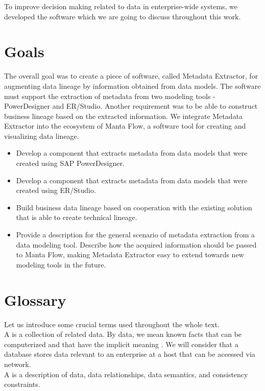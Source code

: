To improve decision making related to data in enterprise-wide systems, we developed the software which we are going to discuss throughout this work.

\section{Goals}

The overall goal was to create a piece of software, called Metadata Extractor, for augmenting data lineage by information obtained from data models. The software must support the extraction of metadata from two modeling tools - PowerDesigner and ER/Studio. Another requirement was to be able to construct business lineage based on the extracted information.
We integrate Metadata Extractor into the ecosystem of Manta Flow, a software tool for creating and visualizing data lineage.

\begin{itemize}
	\item Develop a component that extracts metadata from data models that were created using SAP PowerDesigner.
	\item Develop a component that extracts metadata from data models that were created using ER/Studio.
	\item Build business data lineage based on cooperation with the existing solution that is able to create technical lineage.
	\item Provide a description for the general scenario of metadata extraction from a data modeling tool. Describe how the acquired information should be passed to Manta Flow, making Metadata Extractor easy to extend towards new modeling tools in the future.
\end{itemize}

\section{Glossary}
Let us introduce some crucial terms used throughout the whole text. \\

A  is a collection of related data. By data, we mean known facts that can be computerized and that have the implicit meaning \cite{ElmasryNavathe15}. We will consider that a database stores data relevant to an enterprise at a host that can be accessed via network. \\

A  is a description of data, data relationships, data semantics, and consistency constraints. \label{DataModel} \\

